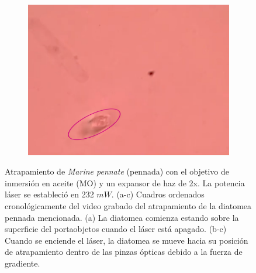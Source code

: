 \documentclass[10pt,aspectratio=1610,compress,dvipsnames]{beamer}
\begin{document}
\begin{frame}
{\begin{figure}
\begin{subfigure}[b]{0.3\textwidth}
         \centering
         \includegraphics[width=\textwidth]{Results/Fifth/pennate3water.png}
         \caption{}
         \label{fig:five over x}
     \end{subfigure}
       
     \caption{Atrapamiento de \textit{Marine pennate} (pennada) con el objetivo de inmersión en aceite (MO) y un expansor de haz de 2x. La potencia láser se estableció en 232 $mW$. (a-c) Cuadros ordenados cronológicamente del video grabado del atrapamiento de la diatomea pennada mencionada. (a) La diatomea comienza estando sobre la superficie del portaobjetos cuando el láser está apagado. (b-c) Cuando se enciende el láser, la diatomea se mueve hacia su posición de atrapamiento dentro de las pinzas ópticas debido a la fuerza de gradiente.}
\label{WIFORTH1}
     
\end{figure}

}

\end{frame}
\end{document}
